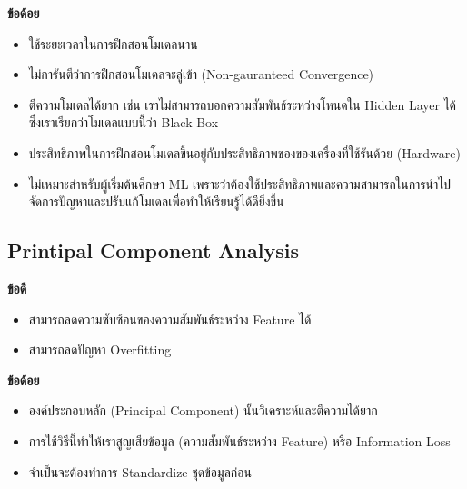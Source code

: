 \noindent \textbf{ข้อด้อย}
%
\begin{itemize}[topsep=0pt,noitemsep]\setlength\itemsep{0.5em}
    \item ใช้ระยะเวลาในการฝึกสอนโมเดลนาน
    
    \item ไม่การันตีว่าการฝึกสอนโมเดลจะลู่เข้า (Non-gauranteed Convergence)
    
    \item ตีความโมเดลได้ยาก เช่น เราไม่สามารถบอกความสัมพันธ์ระหว่างโหนดใน Hidden Layer ได้ ซึ่งเราเรียกว่าโมเดลแบบนี้ว่า Black 
    Box 

    \item ประสิทธิภาพในการฝึกสอนโมเดลขึ้นอยู่กับประสิทธิภาพของของเครื่องที่ใช้รันด้วย (Hardware)
    
    \item ไม่เหมาะสำหรับผู้เริ่มต้นศึกษา ML เพราะว่าต้องใช้ประสิทธิภาพและความสามารถในการนำไปจัดการปัญหาและปรับแก้โมเดลเพื่อทำให้เรียนรู้ได้ดียิ่งขึ้น
\end{itemize}

\subsection{Printipal Component Analysis}
\label{ssec:pros_cons_pca}

\noindent \textbf{ข้อดี}
%
\begin{itemize}[topsep=0pt,noitemsep]\setlength\itemsep{0.5em}
    \item สามารถลดความซับซ้อนของความสัมพันธ์ระหว่าง Feature ได้
    
    \item สามารถลดปัญหา Overfitting
\end{itemize}

\noindent \textbf{ข้อด้อย}
%
\begin{itemize}[topsep=0pt,noitemsep]\setlength\itemsep{0.5em}
    \item องค์ประกอบหลัก (Principal Component) นั้นวิเคราะห์และตีความได้ยาก
    
    \item การใช้วิธีนี้ทำให้เราสูญเสียข้อมูล (ความสัมพันธ์ระหว่าง Feature) หรือ Information Loss
    
    \item จำเป็นจะต้องทำการ Standardize ชุดข้อมูลก่อน
\end{itemize}

